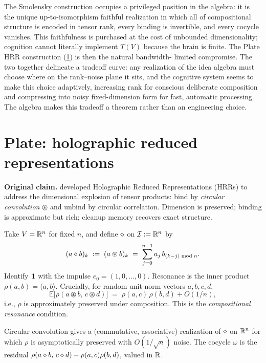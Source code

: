 \litcomment The Smolensky construction occupies a privileged position in
the algebra: it is the unique up-to-isomorphism faithful realization in
which all of compositional structure is encoded in tensor rank, every
binding is invertible, and every cocycle vanishes. This faithfulness is
purchased at the cost of unbounded dimensionality; cognition cannot
literally implement $T(V)$ because the brain is finite. The Plate HRR
construction (\cref{sec:cogsci-plate}) is then the natural bandwidth-
limited compromise. The two together delineate a tradeoff curve: any
realization of the idea algebra must choose where on the rank--noise
plane it sits, and the cognitive system seems to make this choice
adaptively, increasing rank for conscious deliberate composition and
compressing into noisy fixed-dimension form for fast, automatic
processing. The algebra makes this tradeoff a theorem rather than an
engineering choice.

\section{Plate: holographic reduced representations}\label{sec:cogsci-plate}

\textbf{Original claim.} \citet{Plate1995} developed Holographic Reduced
Representations (HRRs) to address the dimensional explosion of tensor
products: bind by \emph{circular convolution} $\circledast$ and unbind by
circular correlation. Dimension is preserved; binding is approximate but
rich; cleanup memory recovers exact structure.

\formalclaim Take $V=\mathbb{R}^n$ for fixed $n$, and define $\mathbin{\diamond}$ on
$\mathcal{I}\mathrel{:=}\mathbb{R}^n$ by
\[
  (a\mathbin{\diamond} b)_k\;\mathrel{:=}\;(a\circledast b)_k
  \;=\;\sum_{j=0}^{n-1}a_j\,b_{(k-j)\bmod n}.
\]
Identify $\mathbf{1}$ with the impulse $e_0=(1,0,\dots,0)$. Resonance is the
inner product $\rho(a,b)=\langle a,b\rangle$. Crucially, for random
unit-norm vectors $a,b,c,d$,
\[
  \mathbb{E}\!\bigl[\rho(a\circledast b,\,c\circledast d)\bigr]
  \;=\;\rho(a,c)\,\rho(b,d) + O(1/n),
\]
i.e., $\rho$ is approximately preserved under composition. This is the
\emph{compositional resonance} condition.

\begin{corollary}\label{cor:cogsci-plate}
Circular convolution gives a (commutative, associative) realization of
$\mathbin{\diamond}$ on $\mathbb{R}^n$ for which $\rho$ is asymptotically preserved with
$O(1/\sqrt{n})$ noise. The cocycle $\omega$ is the residual
$\rho(a\mathbin{\diamond} b,\,c\mathbin{\diamond} d)-\rho(a,c)\rho(b,d)$, valued in $\mathbb{R}$.
\end{corollary}

